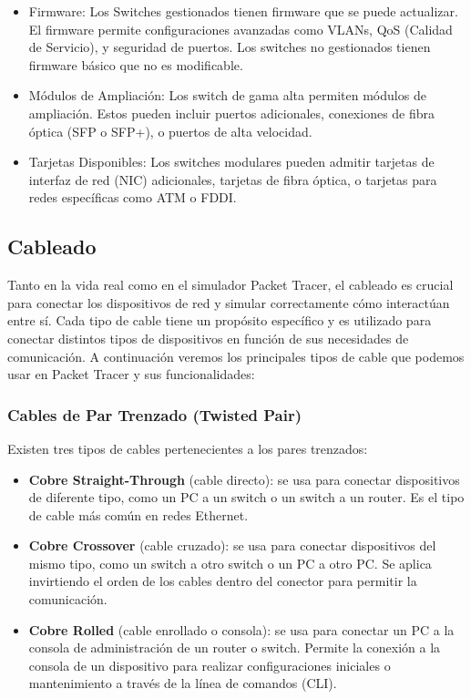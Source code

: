 \documentclass{article}
\begin{document}
\begin{itemize}
    \item Firmware: Los Switches gestionados tienen firmware que se puede actualizar. El firmware permite configuraciones avanzadas como VLANs, QoS (Calidad de Servicio), y seguridad de puertos. Los switches no gestionados tienen firmware básico que no es modificable.
    \item Módulos de Ampliación: Los switch de gama alta permiten módulos de ampliación. Estos pueden incluir puertos adicionales, conexiones de fibra óptica (SFP o SFP+), o puertos de alta velocidad. 
    \item Tarjetas Disponibles: Los switches modulares pueden admitir tarjetas de interfaz de red (NIC) adicionales, tarjetas de fibra óptica, o tarjetas para redes específicas como ATM o FDDI.
\end{itemize}


\subsection{Cableado}
Tanto en la vida real como en el simulador Packet Tracer, el cableado es crucial para conectar los dispositivos de red y simular correctamente cómo interactúan entre sí. Cada tipo de cable tiene un propósito específico y es utilizado para conectar distintos tipos de dispositivos en función de sus necesidades de comunicación. A continuación veremos los principales tipos de cable que podemos usar en Packet Tracer y sus funcionalidades: 

\subsubsection{Cables de Par Trenzado (Twisted Pair)}
Existen tres tipos de cables pertenecientes a los pares trenzados: 
\begin{itemize}
    \item \textbf{Cobre Straight-Through} (cable directo): se usa para conectar dispositivos de diferente tipo, como un PC a un switch o un switch a un router. Es el tipo de cable más común en redes Ethernet.
    \item \textbf{Cobre Crossover} (cable cruzado): se usa para conectar dispositivos del mismo tipo, como un switch a otro switch o un PC a otro PC. Se aplica invirtiendo el orden de los cables dentro del conector para permitir la comunicación.
    \item \textbf{Cobre Rolled} (cable enrollado o consola): se usa para conectar un PC a la consola de administración de un router o switch. Permite la conexión a la consola de un dispositivo para realizar configuraciones iniciales o mantenimiento a través de la línea de comandos (CLI).
\end{itemize}
\end{document}
